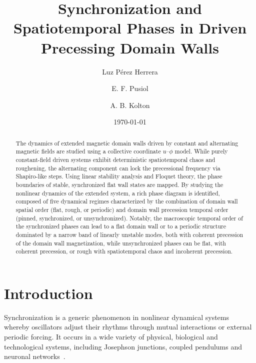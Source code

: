 \documentclass[prb,aps,twocolumn,superscriptaddress,floatfix]{revtex4-2}
\begin{document}
\title{Synchronization and Spatiotemporal Phases in Driven Precessing Domain Walls}

\author{Luz P\'erez Herrera}

\author{E. F. Pusiol}

\author{A. B. Kolton}

\date{\today}

\begin{abstract}
The dynamics of extended magnetic domain walls driven by constant and alternating magnetic fields are studied using a collective coordinate $u$--$\phi$ model. While purely constant-field driven systems exhibit deterministic spatiotemporal chaos and roughening, the alternating component can lock the precessional frequency via Shapiro-like steps. Using linear stability analysis and Floquet theory, the phase boundaries of stable, synchronized flat wall states are mapped. By studying the nonlinear dynamics of the extended system, a rich phase diagram is identified, composed of five dynamical regimes characterized by the combination of domain wall spatial order (flat, rough, or periodic) and domain wall precession temporal order (pinned, synchronized, or unsynchronized). Notably, the macroscopic temporal order of the synchronized phases can lead to a flat domain wall or to a periodic structure dominated by a narrow band of linearly unstable modes, both with coherent precession of the domain wall magnetization, while unsynchronized phases can be flat, with coherent precession, or rough with spatiotemporal chaos and incoherent precession.
\end{abstract}

\maketitle

\section{Introduction}

Synchronization is a generic phenomenon in nonlinear dynamical systems whereby oscillators adjust their rhythms through mutual interactions or external periodic forcing. It occurs in a wide variety of physical, biological and technological systems, including Josephson junctions, coupled pendulums and neuronal networks~\cite{Strogatz2015,Pikovsky_Rosenblum_Kurths_2001}.
\end{document}
